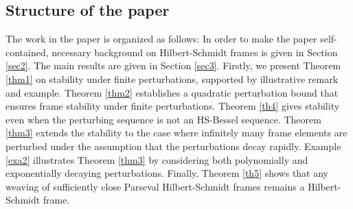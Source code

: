 \documentclass[reqno]{amsart}
\theoremstyle{plain}
\theoremstyle{remark}
\numberwithin{equation}{section}
\begin{document}
\subsection{Structure of the paper}
The work in the paper is organized as follows: In order to make the paper self-contained, necessary background on  Hilbert-Schmidt frames is given in Section \ref{sec2}. The main results are given in  Section \ref{sec3}. Firstly,  we present Theorem \ref{thm1} on stability under finite perturbations, supported by illustrative remark and example. Theorem \ref{thm2} establishes a quadratic perturbation bound that ensures frame stability under finite perturbations. Theorem \ref{th4} gives stability even when the perturbing sequence is not an HS-Bessel sequence.
Theorem \ref{thm3} extends the stability to the case where infinitely many frame elements are perturbed under the assumption that the perturbations decay rapidly. Example \ref{exa2} illustrates Theorem \ref{thm3}  by considering both polynomially and exponentially decaying perturbations. Finally, Theorem \ref{th5} shows that any weaving of sufficiently close Parseval Hilbert-Schmidt frames remains a Hilbert-Schmidt frame.
\end{document}
